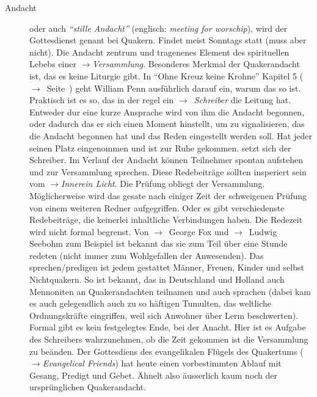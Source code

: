 \begin{description}
 \item[Andacht] oder auch \textit{"`stille Andacht"'} (englisch: \textit{meeting
for worschip}), wird der Gottesdienst genant bei Quakern. Findet meist Sonntags
statt (muss aber nicht). Die Andacht zentrum und tragenenes Element des
spirituellen Lebebs einer $\to$\textit{Versammlung}. Besonderes Merkmal der
Quakerandacht ist, das es keine Liturgie gibt. In "`Ohne Kreuz keine Krohne"'
Kapitel 5 ($\to$~Seite~\pageref{kap5_ab1}) geht William Penn ausführlich darauf
ein, warum das so ist. Praktisch ist es so, das in der regel ein
$\to$~\textit{Schreiber} die Leitung hat. Entweder dur eine kurze Ansprache wird
von ihm die Andacht begonnen, oder dadurch das er sich einen Moment hinstellt,
um zu signalisieren, das die Andacht begonnen hat und das Reden eingestellt
werden soll. Hat jeder seinen Platz eingenommen und ist zur Ruhe gekommen. setzt
sich der Schreiber. Im Verlauf der Andacht können Teilnehmer spontan aufstehen
und zur Versammlung sprechen. Diese Redebeiträge sollten insperiert sein vom
$\to$\textit{Innerein Licht}. Die Prüfung obliegt der Versammlung.
Möglicherweise wird das gesate nach einiger Zeit der schweigenen Prüfung von
einem weiteren Redner aufgegriffen. Oder es gibt verschiedenste Redebeiträge,
die keinerlei inhaltliche Verbindungen haben. Die Redezeit wird nicht formal
begrenst. Von $\to$~George Fox und $\to$~Ludwig Seebohm zum Beispiel ist bekannt
das sie zum Teil über eine Stunde redeten (nicht immer zum Wohlgefallen der
Anwesenden). Das sprechen/predigen ist jedem gestattet Männer, Freuen, Kinder
und selbst Nichtquakern. So ist bekannt, das in Deutschland und Holland auch
Mennoniten an Quakerandachten teilnamen und auch sprachen (dabei kam es auch
gelegendlich auch zu so häftigen Tumulten, das weltliche Ordnungskräfte
eingriffen, weil sich Anwohner über Lerm beschwerten). Formal gibt es kein
festgelegtes Ende, bei der Anacht. Hier ist es Aufgabe des Schreibers
wahrzunehmen, ob die Zeit gekommen ist die Versammlung zu beänden.  Der
Gottesdiens des evangelikalen Flügels des Quakertums ($\to$\textit{Evangelical
Friends}) hat heute einen vorbestimmten Ablauf mit Gesang, Predigt und Gebet.
Ähnelt also äusserlich kaum noch der ursprünglichen Quakerandacht.

 \end{description}
\normalsize
